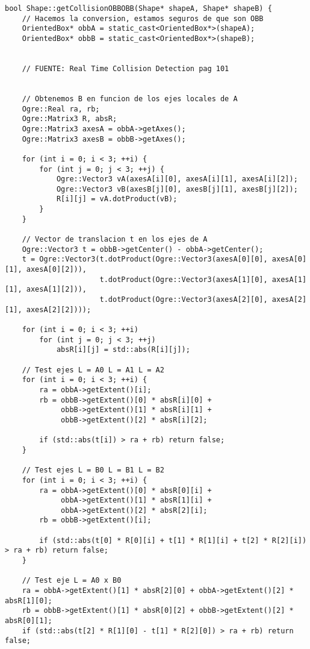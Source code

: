 \begin{lstlisting}[style=C++]
bool Shape::getCollisionOBBOBB(Shape* shapeA, Shape* shapeB) {
    // Hacemos la conversion, estamos seguros de que son OBB
    OrientedBox* obbA = static_cast<OrientedBox*>(shapeA);
    OrientedBox* obbB = static_cast<OrientedBox*>(shapeB);

    
    // FUENTE: Real Time Collision Detection pag 101


    // Obtenemos B en funcion de los ejes locales de A
    Ogre::Real ra, rb;
    Ogre::Matrix3 R, absR;
    Ogre::Matrix3 axesA = obbA->getAxes();
    Ogre::Matrix3 axesB = obbB->getAxes();

    for (int i = 0; i < 3; ++i) {
        for (int j = 0; j < 3; ++j) {
            Ogre::Vector3 vA(axesA[i][0], axesA[i][1], axesA[i][2]);
            Ogre::Vector3 vB(axesB[j][0], axesB[j][1], axesB[j][2]);
            R[i][j] = vA.dotProduct(vB);
        }
    }

    // Vector de translacion t en los ejes de A
    Ogre::Vector3 t = obbB->getCenter() - obbA->getCenter();
    t = Ogre::Vector3(t.dotProduct(Ogre::Vector3(axesA[0][0], axesA[0][1], axesA[0][2])),
                      t.dotProduct(Ogre::Vector3(axesA[1][0], axesA[1][1], axesA[1][2])),
                      t.dotProduct(Ogre::Vector3(axesA[2][0], axesA[2][1], axesA[2][2])));
        
    for (int i = 0; i < 3; ++i) 
        for (int j = 0; j < 3; ++j)
            absR[i][j] = std::abs(R[i][j]);

    // Test ejes L = A0 L = A1 L = A2
    for (int i = 0; i < 3; ++i) {
        ra = obbA->getExtent()[i];
        rb = obbB->getExtent()[0] * absR[i][0] +
             obbB->getExtent()[1] * absR[i][1] +
             obbB->getExtent()[2] * absR[i][2];

        if (std::abs(t[i]) > ra + rb) return false;
    }

    // Test ejes L = B0 L = B1 L = B2
    for (int i = 0; i < 3; ++i) {
        ra = obbA->getExtent()[0] * absR[0][i] +
             obbA->getExtent()[1] * absR[1][i] +
             obbA->getExtent()[2] * absR[2][i];
        rb = obbB->getExtent()[i];

        if (std::abs(t[0] * R[0][i] + t[1] * R[1][i] + t[2] * R[2][i]) > ra + rb) return false;
    }
   
    // Test eje L = A0 x B0
    ra = obbA->getExtent()[1] * absR[2][0] + obbA->getExtent()[2] * absR[1][0];
    rb = obbB->getExtent()[1] * absR[0][2] + obbB->getExtent()[2] * absR[0][1];
    if (std::abs(t[2] * R[1][0] - t[1] * R[2][0]) > ra + rb) return false;


\end{lstlisting}
